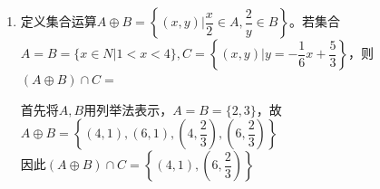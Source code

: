 \begin{enumerate}
\begin{jieda}
\begin{enumerate}
            则当$x \in B, x \notin D \Longrightarrow x \in A$ \\
          同理可得$x \in D, x \notin B \Longrightarrow x \in A$ \\
          因此题干条件表明：集合B和集合D中各自特有的元素都是A的元素，因此$B \cap D \subseteq \overline{A}$，所以$\overline{A} \cap B = \overline{A} \cap D = B \cap D$
          \item 方法3：画文氏图，逐一判断
        \end{enumerate}
    \end{jieda}
    \item 定义集合运算$A \oplus B = \left\{(x, y) | \dfrac{x}{2} \in A, \dfrac{2}{y} \in B\right\}$。若集合$A = B = \{x \in N| 1 < x < 4\}, C = \left\{(x, y) | y = -\dfrac{1}{6}x + \dfrac{5}{3} \right\}$，则$(A \oplus B) \cap C = $
    \begin{jieda}
        首先将$A, B$用列举法表示，$A = B = \{2,3\}$，故$A \oplus B = \left\{(4,1), (6,1), \left(4,\dfrac{2}{3}\right), \left(6, \dfrac{2}{3}\right) \right\}$ \\
        因此$(A \oplus B) \cap C = \left\{(4,1), \left(6, \dfrac{2}{3}\right)\right\}$
    \end{jieda} 
\end{enumerate}